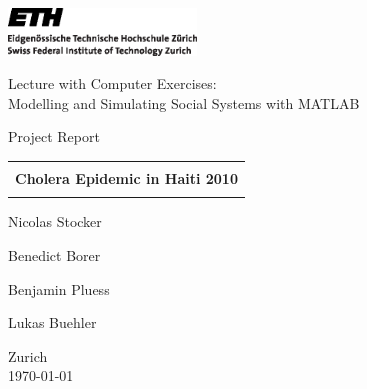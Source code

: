 
\thispagestyle{empty}

\begin{center}
\includegraphics[width=5cm]{Bilder/ETHlogo.eps}

\bigskip


\bigskip


\bigskip


\LARGE{ 	Lecture with Computer Exercises:\\ }
\LARGE{ Modelling and Simulating Social Systems with MATLAB\\}

\bigskip

\bigskip

\small{Project Report}\\

\bigskip

\bigskip

\bigskip

\bigskip


\begin{tabular}{|c|}
\hline
\\
\textbf{\LARGE{Cholera Epidemic in Haiti 2010}}\\
\\
\hline
\end{tabular}
\bigskip

\bigskip

\bigskip

\LARGE{Nicolas Stocker 

Benedict Borer

Benjamin Pluess 

Lukas Buehler}



\bigskip

\bigskip

\bigskip

\bigskip

\bigskip

\bigskip

\bigskip

\bigskip

Zurich\\
\today\\
\end{center}


